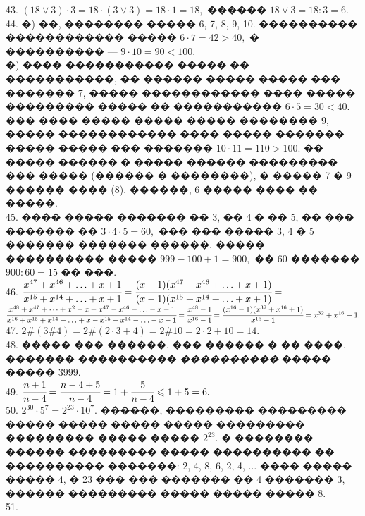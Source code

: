 \documentclass[12pt]{article}
\begin{document}
43. $(18\vee 3)\cdot3=18\cdot(3\vee3)=18\cdot1=18,$ ������ $18\vee3=18:3=6.$\\
44. �) ��, �������� ����� 6, 7, 8, 9, 10. ���������� ������������ ����� $6\cdot7=42>40,$ � ���������� --- $9\cdot10=90<100.$\\
�) ���� ����������� ����� �� �����������, �� ������ ����� ����� ��� ������� 7, ����� ������������ ���� ����� ��������� ����� �� ����������� $6\cdot5=30<40.$ ��� ���� ����� ����� ����� �������� 9, ����� ������������ ���� ����� ������� ����� ����� ��� ������� $10\cdot11=110>100.$ �� ����� ������ � ����� ������ ��������� ��� ����� (������ � ��������), � ����� 7 � 9 ������ ���� (8). ������, 6 ����� ���� �� �����.\\
45. ���� ����� ������� �� 3, �� 4 � �� 5, �� ��� ������� �� $3\cdot4\cdot5=60,$ ��� ��� ����� 3, 4 � 5 ������� ������� ������. ����� ���������� ����� $999-100+1=900,$ �� 60 ������� $900:60=15$ �� ���.\\
46. $\cfrac{x^{47}+x^{46}+\ldots+x+1}{x^{15}+x^{14}+\ldots+x+1}=\cfrac{(x-1)(x^{47}+x^{46}+\ldots+x+1)}{(x-1)(x^{15}+x^{14}+\ldots+x+1)}=$\\$
\cfrac{x^{48}+x^{47}+\cdots+x^2+x-x^{47}-x^{46}-\ldots-x-1}{x^{16}+x^{15}+x^{14}+\ldots+x-x^{15}-x^{14}-\ldots-x-1}=\cfrac{x^{48}-1}{x^{16}-1}=
\cfrac{(x^{16}-1)(x^{32}+x^{16}+1)}{x^{16}-1}=x^{32}+x^{16}+1.$\\
47. $2\#(3\#4)=2\#(2\cdot3+4)=2\#10=2\cdot2+10=14.$\\
48. ����� ��� ������, ��� ������ � �� ����, ������� ���������� {\it ����������} ����� ����� 3999.\\
49. $\cfrac{n+1}{n-4}=\cfrac{n-4+5}{n-4}=1+\cfrac{5}{n-4}\leqslant1+5=6.$\\
50. $2^{30}\cdot5^7=2^{23}\cdot10^7.$ ������, ��������� ��������� ����� ����� ����� ����� ��������� ��������� ����� ����� $2^{23}.$ � �������� ������ ��������� ����� ���������� �� ���������� �������: 2, 4, 8, 6, 2, 4, $\ldots$ ���� ����� ����� 4, � 23 ��� ��� ������� �� 4 ������� 3, ������ ��������� ����� ����� ����� 8.\\
51.
\begin{figure}[ht!]
\end{figure}\\
\end{document}
